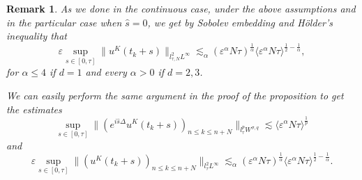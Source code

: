 \documentclass[10pt,a4paper]{article}
\newtheorem{remark}[theorem]{Remark}
\begin{document}
  \begin{remark}\label{remuKlpLq}
    As we done in the continuous case, under the above assumptions and in the
    particular case when \(\hat{s}=0\), we get by Sobolev embedding and H\"older's
    inequality that
    \begin{equation}\label{uKl2Linfty}
      \varepsilon \sup_{s\in[0,\tau]} \|u^K(t_k+s)\|_{l^2_{\tau,N} L^\infty}
      \lesssim_{\alpha} {(\varepsilon^\alpha N\tau)}^\frac1\alpha {\langle\varepsilon^\alpha N\tau\rangle}^{\frac12-\frac1\alpha},
    \end{equation}
    for \(\alpha\leq4\) if \(d=1\) and every \(\alpha>0\) if \(d=2,3\).
    
    We can easily perform the same argument in the proof of the proposition to get
    the estimates
    \[ \sup_{s\in[0,\tau]} \|\left(e^{i\hat{s}\Delta}u^K(t_k+s)\right)_{n\leq k\leq n+N}\|
    _{l^p_{\tau} W^{\sigma,q}} \lesssim \langle\varepsilon^\alpha N\tau\rangle^\frac1p \]
    and 
    \[
      \varepsilon \sup_{s\in[0,\tau]} \|\left(u^K(t_k+s)\right)_{n\leq k\leq n+N}\|
      _{l^2_{\tau} L^\infty} \lesssim_{\alpha} {(\varepsilon^\alpha N\tau)}^\frac1\alpha
      {\langle\varepsilon^\alpha N\tau\rangle}^{\frac12-\frac1\alpha}.\]
  \end{remark}
\end{document}
